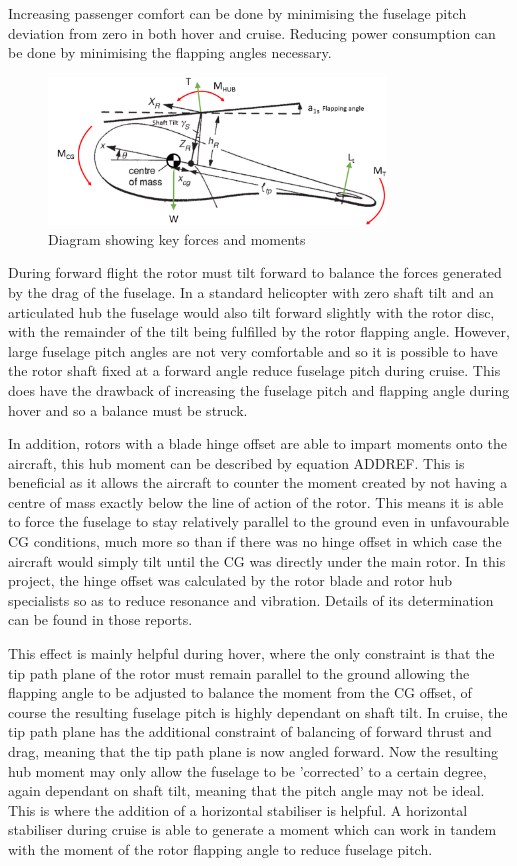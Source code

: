 \documentclass[11pt,a4paper]{article}
\begin{document}
Increasing passenger comfort can be done by minimising the fuselage pitch deviation from zero in both hover and cruise. Reducing power consumption can be done by minimising the flapping angles necessary.
\begin{figure}[H]
    \centering
    \includegraphics[width=0.8\textwidth]{FBD.PNG}
    \caption{Diagram showing key forces and moments}
    \label{fig:fbd}
\end{figure}{}
During forward flight the rotor must tilt forward to balance the forces generated by the drag of the fuselage.
In a standard helicopter with zero shaft tilt and an articulated hub the fuselage would also tilt forward slightly with the rotor disc, with the remainder of the tilt being fulfilled by the rotor flapping angle. 
However, large fuselage pitch angles are not very comfortable and so it is possible to have the rotor shaft fixed at a forward angle reduce fuselage pitch during cruise. This does have the drawback of increasing the fuselage pitch and flapping angle during hover and so a balance must be struck.

In addition, rotors with a blade hinge offset are able to impart moments onto the aircraft, this hub moment can be described by equation ADDREF. This is beneficial as it allows the aircraft to counter the moment created by not having a centre of mass exactly below the line of action of the rotor. This means it is able to force the fuselage to stay relatively parallel to the ground even in unfavourable CG conditions, much more so than if there was no hinge offset in which case the aircraft would simply tilt until the CG was directly under the main rotor. In this project, the hinge offset was calculated by the rotor blade and rotor hub specialists so as to reduce resonance and vibration. Details of its determination can be found in those reports.

This effect is mainly helpful during hover, where the only constraint is that the tip path plane of the rotor must remain parallel to the ground allowing the flapping angle to be adjusted to balance the moment from the CG offset, of course the resulting fuselage pitch is highly dependant on shaft tilt. In cruise, the tip path plane has the additional constraint of balancing of forward thrust and drag, meaning that the tip path plane is now angled forward. Now the resulting hub moment may only allow the fuselage to be 'corrected' to a certain degree, again dependant on shaft tilt, meaning that the pitch angle may not be ideal. \\
This is where the addition of a horizontal stabiliser is helpful. A horizontal stabiliser during cruise is able to generate a moment which can work in tandem with the moment of the rotor flapping angle to reduce fuselage pitch.
\end{document}
